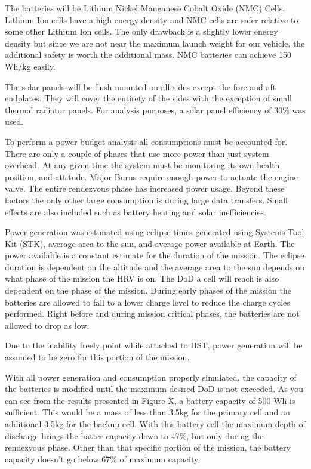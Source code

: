 \documentclass[onecolumn,10pt]{jhwhw}
\begin{document}
The batteries will be Lithium Nickel Manganese Cobalt Oxide (NMC) Cells. Lithium Ion cells have a high energy density and NMC cells are safer relative to some other Lithium Ion cells. The only drawback is a slightly lower energy density but since we are not near the maximum launch weight for our vehicle, the additional safety is worth the additional mass. NMC batteries can achieve 150 Wh/kg easily.

The solar panels will be flush mounted on all sides except the fore and aft endplates. They will cover the entirety of the sides with the exception of small thermal radiator panels. For analysis purposes, a solar panel efficiency of 30\% was used.

To perform a power budget analysis all consumptions must be accounted for. There are only a couple of phases that use more power than just system overhead. At any given time the system must be monitoring its own health, position, and attitude. Major Burns require enough power to actuate the engine valve. The entire rendezvous phase has increased power usage. Beyond these factors the only other large consumption is during large data transfers. Small effects are also included such as battery heating and solar inefficiencies.

Power generation was estimated using eclipse times generated using Systems Tool Kit (STK), average area to the sun, and average power available at Earth. The power available is a constant estimate for the duration of the mission. The eclipse duration is dependent on the altitude and the average area to the sun depends on what phase of the mission the HRV is on. The DoD a cell will reach is also dependent on the phase of the mission. During early phases of the mission the batteries are allowed to fall to a lower charge level to reduce the charge cycles performed. Right before and during mission critical phases, the batteries are not allowed to drop as low.

Due to the inability freely point while attached to HST, power generation will be assumed to be zero for this portion of the mission.

With all power generation and consumption properly simulated, the capacity of the batteries is modified until the maximum desired DoD is not exceeded. As you can see from the results presented in Figure X, a battery capacity of 500 Wh is sufficient. This would be a mass of less than 3.5kg for the primary cell and an additional 3.5kg for the backup cell. With this battery cell the maximum depth of discharge brings the batter capacity down to 47\%, but only during the rendezvous phase. Other than that specific portion of the mission, the battery capacity doesn't go below 67\% of maximum capacity.
\end{document}
